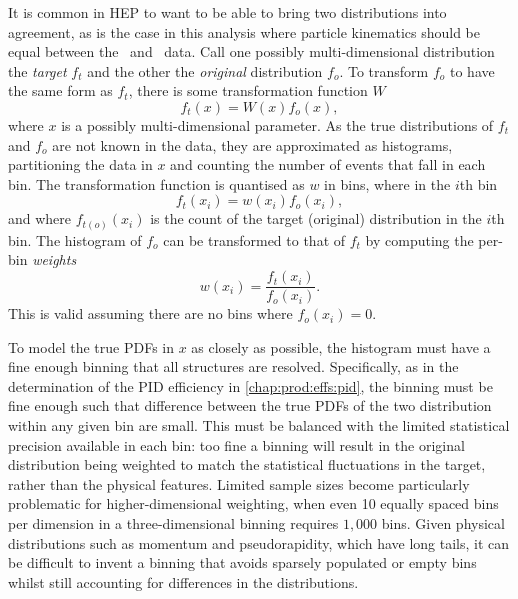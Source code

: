 It is common in \acl{HEP} to want to be able to bring two distributions into
agreement, as is the case in this analysis where particle kinematics should be
equal between the \pKK\ and \ppipi\ data.
Call one possibly multi-dimensional distribution the \emph{target} $f_{t}$ and
the other the \emph{original} distribution $f_{o}$.
To transform $f_{o}$ to have the same form as $f_{t}$, there is some
transformation function $W$
\begin{equation}
  f_{t}(x) = W(x)f_{o}(x),
\end{equation}
where $x$ is a possibly multi-dimensional parameter.
As the true distributions of $f_{t}$ and $f_{o}$ are not known in the data,
they are approximated as histograms, partitioning the data in $x$ and counting
the number of events that fall in each bin.
The transformation function is quantised as $w$ in bins, where in the $i$th bin
\begin{equation}
  f_{t}(x_{i}) = w(x_{i})f_{o}(x_{i}),
\end{equation}
and where $f_{t(o)}(x_{i})$ is the count of the target (original) distribution
in the $i$th bin.
The histogram of $f_{o}$ can be transformed to that of $f_{t}$ by computing the
per-bin \emph{weights}
\begin{equation}
  w(x_{i}) = \frac{f_{t}(x_{i})}{f_{o}(x_{i})}.
\end{equation}
This is valid assuming there are no bins where $f_{o}(x_{i}) = 0$.

To model the true \aclp{PDF} in $x$ as closely as possible, the histogram must
have a fine enough binning that all structures are resolved.
Specifically, as in the determination of the \ac{PID} efficiency in
\cref{chap:prod:effs:pid}, the binning must be fine enough such that difference
between the true \acp{PDF} of the two distribution within any given bin are
small.
This must be balanced with the limited statistical precision available in each
bin: too fine a binning will result in the original distribution being weighted
to match the statistical fluctuations in the target, rather than the physical
features.
Limited sample sizes become particularly problematic for higher-dimensional
weighting, when even 10 equally spaced bins per dimension in a
three-dimensional binning requires $1,000$ bins.
Given physical distributions such as momentum and pseudorapidity, which have
long tails, it can be difficult to invent a binning that avoids sparsely
populated or empty bins whilst still accounting for differences in the
distributions.


